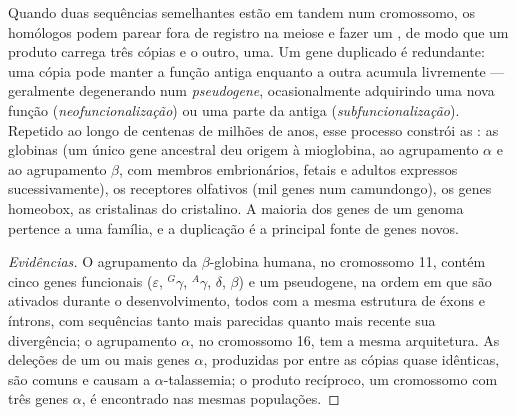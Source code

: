 \begin{proposition}\label{prop:b2:genome-diversification:duplication}
Quando duas sequências semelhantes estão em tandem num cromossomo, os
homólogos podem parear fora de registro na meiose e fazer um
, de modo que um produto carrega três cópias e o
outro, uma. Um gene duplicado é redundante: uma cópia pode manter a
função antiga enquanto a outra acumula  livremente ---
geralmente degenerando num \emph{pseudogene}, ocasionalmente adquirindo
uma nova função (\emph{neofuncionalização}) ou uma parte da antiga
(\emph{subfuncionalização}). Repetido ao longo de centenas de milhões
de anos, esse processo constrói as \emph{}: as
globinas (um único gene ancestral deu origem à mioglobina, ao
agrupamento $\alpha$ e ao agrupamento
$\beta$, com membros embrionários, fetais e adultos expressos
sucessivamente), os receptores olfativos (mil genes num camundongo),
os genes homeobox, as cristalinas do cristalino. A maioria dos genes
de um genoma pertence a uma família, e a duplicação é a principal
fonte de genes novos.
\end{proposition}
\begin{proof}[Evidências]
O agrupamento da $\beta$-globina humana, no cromossomo 11, contém cinco
genes funcionais ($\varepsilon$, $^{G}\gamma$, $^{A}\gamma$,
$\delta$, $\beta$) e um pseudogene, na ordem em que são ativados
durante o desenvolvimento, todos com a mesma estrutura de éxons e
íntrons, com sequências tanto mais parecidas quanto mais recente sua
divergência; o agrupamento $\alpha$, no cromossomo 16, tem a mesma
arquitetura. As deleções de um ou mais genes $\alpha$, produzidas por
 entre as cópias quase idênticas, são comuns e
causam a $\alpha$-talassemia; o produto recíproco, um cromossomo com
três genes $\alpha$, é encontrado nas mesmas populações.
\end{proof}

